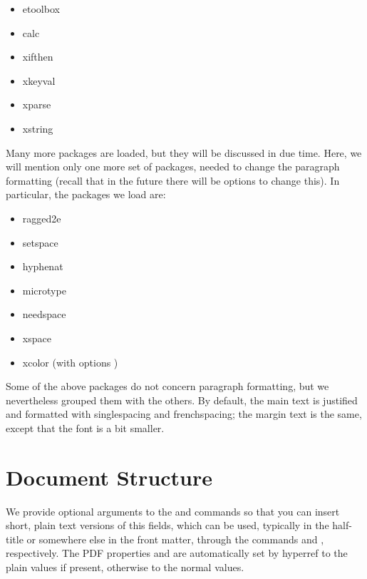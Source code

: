 \begin{itemize}
	\item etoolbox
	\item calc
	\item xifthen
	\item xkeyval
	\item xparse
	\item xstring
\end{itemize}

Many more packages are loaded, but they will be discussed in due time.
Here, we will mention only one more set of packages, needed to change
the paragraph formatting (recall that in the future there will be
options to change this). In particular, the packages we load are:

\begin{itemize}
	\item ragged2e
	\item setspace
	\item hyphenat
	\item microtype
	\item needspace
	\item xspace
	\item xcolor (with options )
\end{itemize}

Some of the above packages do not concern paragraph formatting, but we
nevertheless grouped them with the others. By default, the main text is
justified and formatted with singlespacing and frenchspacing; the margin
text is the same, except that the font is a bit smaller.

\section{Document Structure}

We provide optional arguments to the  and
 commands so that you can insert short, plain text
versions of this fields, which can be used, typically in the half-title
or somewhere else in the front matter, through the commands
 and , respectively. The PDF
properties  and  are automatically
set by hyperref to the plain values if present, otherwise to the normal
values.

